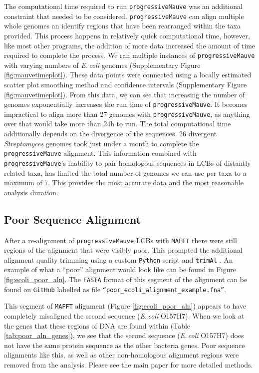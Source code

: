 \documentclass[11pt]{article}
\newcommand{\strep}{\textit{Streptomyces}\xspace}
\newcommand{\ecol}{\textit{E.\,coli}\xspace}
\newcommand{\p}{\texttt{progressiveMauve}\xspace}
\begin{document}
The computational time required to run \p was an additional constraint that needed to be considered.
\p can align multiple whole genomes an identify regions that have been rearranged within the taxa provided.
This process happens in relatively quick computational time, however, like most other programs, the addition of more data increased the amount of time required to complete the process.
We ran multiple instances of \p with varying numbers of \ecol genomes (Supplementary Figure \ref{fig:mauvetimeplot}).
These data points were connected using a locally estimated scatter plot smoothing method and confidence intervals (Supplementary Figure \ref{fig:mauvetimeplot}).
From this data, we can see that increasing the number of genomes exponentially increases the run time of \p.
It becomes impractical to align more than 27 genomes with \p, as anything over that would take more than 24h to run.
The total computational time additionally depends on the divergence of the sequences.
26 divergent \strep genomes took just under a month to complete the \p alignment.
This information combined with \p's inability to pair homologous sequences in LCBs of distantly related taxa, has limited the total number of genomes we can use per taxa to a maximum of 7.
This provides the most accurate data and the most reasonable analysis duration.


\subsection{Poor Sequence Alignment}
After a re-alignment of \p LCBs with \texttt{MAFFT} there were still regions of the alignment that were visibly poor.
This prompted the additional alignment quality trimming using a custom \texttt{Python} script and \texttt{trimAl} \citep{capella2009trimal}.
An example of what a ``poor'' alignment would look like can be found in Figure \ref{fig:ecoli_poor_aln}.
The \texttt{FASTA} format of this segment of the alignment can be found on \texttt{GitHub} labelled as file \texttt{``poor\_ecoli\_alignment\_example.fna''}.

This segment of \texttt{MAFFT} alignment (Figure \ref{fig:ecoli_poor_aln}) appears to have completely misaligned the second sequence (\ecol O157H7).
When we look at the genes that these regions of DNA are found within (Table \ref{tab:poor_aln_genes}), we see that the second sequence (\ecol O157H7) does not have the same protein sequence as the other bacteria genes.
Poor sequence alignments like this, as well as other non-homologous alignment regions were removed from the analysis.
Please see the main paper for more detailed methods.
\end{document}
